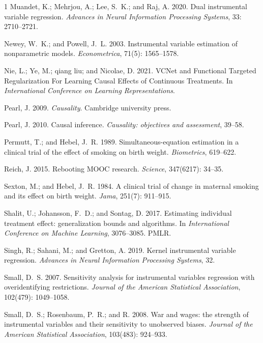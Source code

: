 \documentclass[journal]{IEEEtran}
\begin{document}
\begin{thebibliography}{1}
Muandet, K.; Mehrjou, A.; Lee, S.~K.; and Raj, A. 2020.
\newblock Dual instrumental variable regression.
\newblock \emph{Advances in Neural Information Processing Systems}, 33: 2710--2721.

Newey, W.~K.; and Powell, J.~L. 2003.
\newblock Instrumental variable estimation of nonparametric models.
\newblock \emph{Econometrica}, 71(5): 1565--1578.

Nie, L.; Ye, M.; qiang liu; and Nicolae, D. 2021.
\newblock VCNet and Functional Targeted Regularization For Learning Causal Effects of Continuous Treatments.
\newblock In \emph{International Conference on Learning Representations}.

Pearl, J. 2009.
\newblock \emph{Causality}.
\newblock Cambridge university press.

Pearl, J. 2010.
\newblock Causal inference.
\newblock \emph{Causality: objectives and assessment}, 39--58.

Permutt, T.; and Hebel, J.~R. 1989.
\newblock Simultaneous-equation estimation in a clinical trial of the effect of smoking on birth weight.
\newblock \emph{Biometrics}, 619--622.

Reich, J. 2015.
\newblock Rebooting MOOC research.
\newblock \emph{Science}, 347(6217): 34--35.

Sexton, M.; and Hebel, J.~R. 1984.
\newblock A clinical trial of change in maternal smoking and its effect on birth weight.
\newblock \emph{Jama}, 251(7): 911--915.

Shalit, U.; Johansson, F.~D.; and Sontag, D. 2017.
\newblock Estimating individual treatment effect: generalization bounds and algorithms.
\newblock In \emph{International Conference on Machine Learning}, 3076--3085. PMLR.

Singh, R.; Sahani, M.; and Gretton, A. 2019.
\newblock Kernel instrumental variable regression.
\newblock \emph{Advances in Neural Information Processing Systems}, 32.

Small, D.~S. 2007.
\newblock Sensitivity analysis for instrumental variables regression with overidentifying restrictions.
\newblock \emph{Journal of the American Statistical Association}, 102(479): 1049--1058.

Small, D.~S.; Rosenbaum, P.~R.; and R. 2008.
\newblock War and wages: the strength of instrumental variables and their sensitivity to unobserved biases.
\newblock \emph{Journal of the American Statistical Association}, 103(483): 924--933.


\end{thebibliography}
\end{document}
